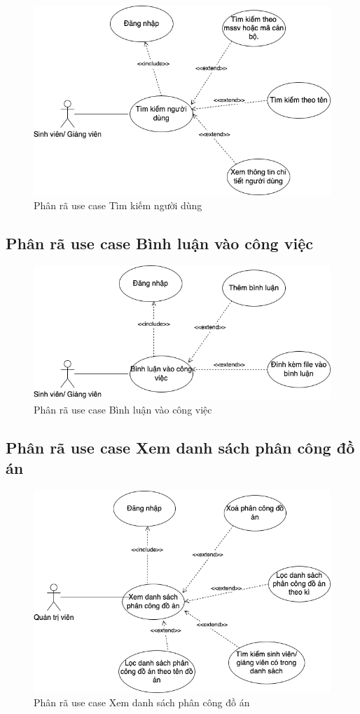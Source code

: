 \documentclass[../Main.tex]{subfiles}
\begin{document}
\begin{figure}[H]
    \centering
    \includegraphics[width=0.9\linewidth]{Figure/use_case_tim_kiem.png}
    \caption{Phân rã use case Tìm kiếm người dùng}
   \label{fig:use_case_tim_kiem}
\end{figure}

\newpage
\subsection{Phân rã use case Bình luận vào công việc}
\begin{figure}[H]
    \centering
    \includegraphics[width=0.8\linewidth]{Figure/use_case_binh_luan_task.png}
    \caption{Phân rã use case Bình luận vào công việc}
    \label{fig:use_case_binh_luan_task}
\end{figure}

\subsection{Phân rã use case Xem danh sách phân công đồ án}
\begin{figure}[H]
    \centering
    \includegraphics[width=0.75\linewidth]{Figure/use_case_xem_ds_phan_cong.png}
    \caption{Phân rã use case Xem danh sách phân công đồ án}
    \label{fig:use_case_xem_ds_phan_cong}
\end{figure}
\end{document}

